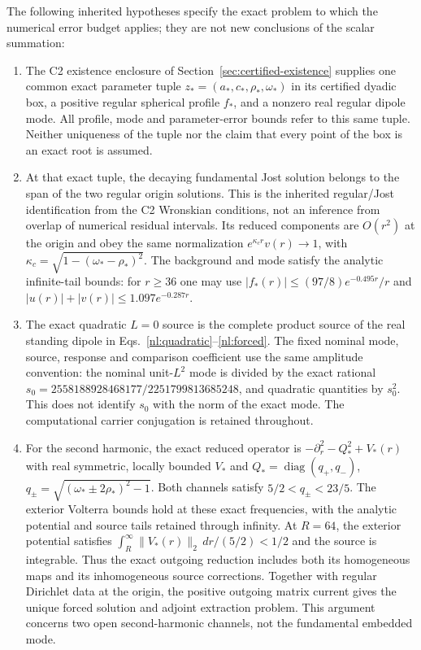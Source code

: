 The following inherited hypotheses specify the exact problem to which
the numerical error budget applies; they are not new conclusions of
the scalar summation:
\begin{enumerate}
\item The C2 existence enclosure of Section~\ref{sec:certified-existence}
supplies one common exact parameter tuple
$z_*=(a_*,c_*,\rho_*,\omega_*)$ in its certified dyadic box, a positive
regular spherical profile $f_*$, and a nonzero real regular dipole mode.
All profile, mode and parameter-error bounds refer to this same tuple.
Neither uniqueness of the tuple nor the claim that every point of the
box is an exact root is assumed.

\item At that exact tuple, the decaying fundamental Jost solution belongs
to the span of the two regular origin solutions. This is the inherited
regular/Jost identification from the C2 Wronskian conditions, not an
inference from overlap of numerical residual intervals. Its reduced
components are $O(r^2)$ at the origin and obey the same normalization
$e^{\kappa_c r}v(r)\to1$, with
$\kappa_c=\sqrt{1-(\omega_*-\rho_*)^2}$.
The background and mode satisfy the analytic infinite-tail bounds:
for $r\ge36$ one may use
$|f_*(r)|\le(97/8)e^{-0.495r}/r$ and
$|u(r)|+|v(r)|\le1.097e^{-0.287r}$.

\item The exact quadratic $L=0$ source is the complete product source
of the real standing dipole in Eqs.~\eqref{nl:quadratic}--\eqref{nl:forced}.
The fixed nominal mode, source, response and comparison coefficient
use the same amplitude convention: the nominal unit-$L^2$ mode is divided
by the exact rational
$s_0=2558188928468177/2251799813685248$, and quadratic quantities by $s_0^2$.
This does not identify $s_0$ with the norm of the exact mode.
The computational carrier conjugation is retained throughout.

\item For the second harmonic, the exact reduced operator is
$-\partial_r^2-Q_*^2+V_*(r)$ with real symmetric, locally bounded
$V_*$ and
$Q_*=\operatorname{diag}(q_+,q_-)$,
$q_\pm=\sqrt{(\omega_*\pm2\rho_*)^2-1}$.
Both channels satisfy $5/2<q_\pm<23/5$.
The exterior Volterra bounds hold at these exact frequencies,
with the analytic potential and source tails retained through infinity.
At $R=64$, the exterior potential satisfies
$\int_R^\infty\|V_*(r)\|_2\,dr/(5/2)<1/2$ and the source is integrable.
Thus the exact outgoing reduction includes both its homogeneous maps
and its inhomogeneous source corrections. Together with regular
Dirichlet data at the origin, the positive outgoing matrix current
gives the unique forced solution and adjoint extraction problem.
This argument concerns two open second-harmonic channels, not the
fundamental embedded mode.


\end{enumerate}
